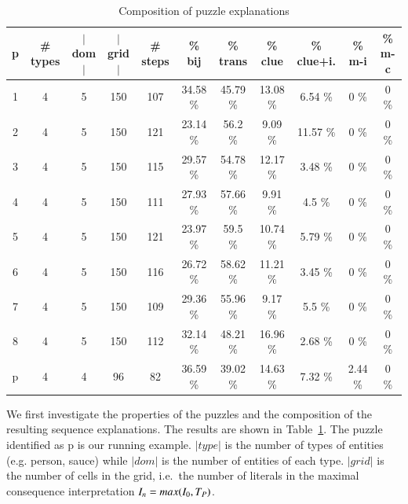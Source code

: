 \begin{table}
	\centering
\begin{tabular}{c|cccc|cccccc}
     \textbf{p} &  \textbf{\# types} &  \textbf{$|$dom$|$} &  \textbf{$|$grid$|$} &  \textbf{\# steps} &  \textbf{\% bij} &  \textbf{\% trans} &  \textbf{\% clue} & \textbf{\% clue+i.} &   \textbf{\% m-i} &  \textbf{\% m-c} \\
    \hline
         1 &       4 &            5 &         150 &    107 &  34.58 \% &  45.79 \% &        13.08 \% &       6.54 \% &     0 \% &    0 \% \\
    2 &       4 &            5 &         150 &    121 &  23.14 \% &   56.2 \% &         9.09 \% &      11.57 \% &     0 \% &    0 \% \\
    3 &       4 &            5 &         150 &    115 &  29.57 \% &  54.78 \% &        12.17 \% &       3.48 \% &     0 \% &    0 \% \\
    4 &       4 &            5 &         150 &    111 &  27.93 \% &  57.66 \% &         9.91 \% &        4.5 \% &     0 \% &    0 \% \\
    5 &       4 &            5 &         150 &    121 &  23.97 \% &   59.5 \% &        10.74 \% &       5.79 \% &     0 \% &    0 \% \\
    6 &       4 &            5 &         150 &    116 &  26.72 \% &  58.62 \% &        11.21 \% &       3.45 \% &     0 \% &    0 \% \\
    7 &       4 &            5 &         150 &    109 &  29.36 \% &  55.96 \% &         9.17 \% &        5.5 \% &     0 \% &    0 \% \\
    8 &       4 &            5 &         150 &    112 &  32.14 \% &  48.21 \% &        16.96 \% &       2.68 \% &     0 \% &    0 \% \\
    p &       4 &            4 &          96 &     82 &  36.59 \% &  39.02 \% &        14.63 \% &       7.32 \% &  2.44 \% &    0 \%
    \end{tabular}
    \caption{Composition of puzzle explanations}
    \label{table:composition}
    \end{table}

We first investigate the properties of the puzzles and the composition of the resulting sequence explanations. The results are shown in Table~\ref{table:composition}. The puzzle identified as p is our running example. $|type|$ is the number of types of entities (e.g. person, sauce) while $|dom|$ is the number of entities of each type. $|grid|$ is the number of cells in the grid, i.e.\ the number of literals in the maximal consequence interpretation $I_n=max(I_0,T_P)$.


